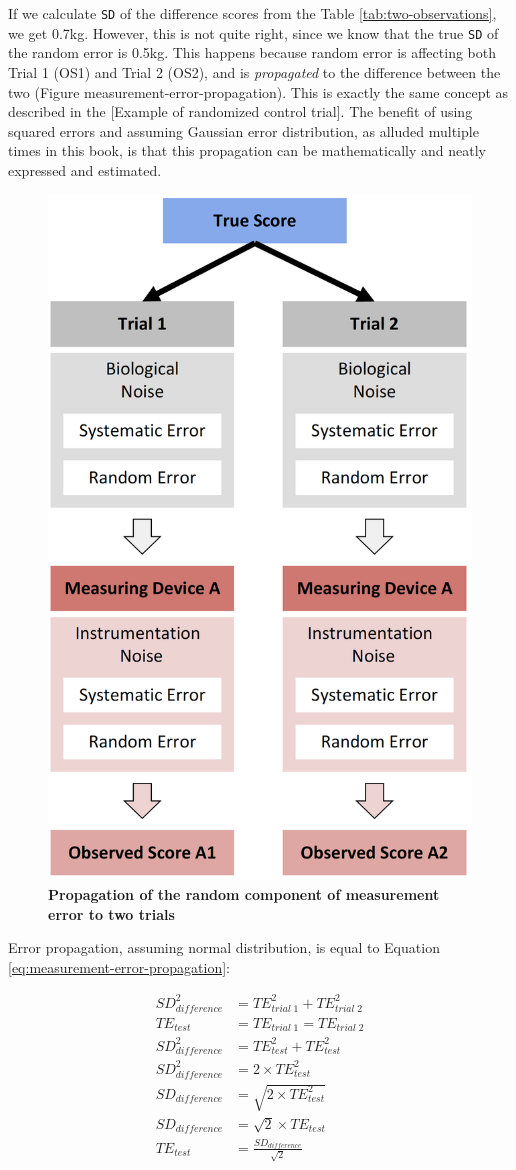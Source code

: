 \documentclass[
]{book}
\begin{document}
If we calculate \texttt{SD} of the difference scores from the Table \ref{tab:two-observations}, we get 0.7kg. However, this is not quite right, since we know that the true \texttt{SD} of the random error is 0.5kg. This happens because random error is affecting both Trial 1 (OS1) and Trial 2 (OS2), and is \emph{propagated} to the difference between the two (Figure measurement-error-propagation). This is exactly the same concept as described in the {[}Example of randomized control trial{]}. The benefit of using squared errors and assuming Gaussian error distribution, as alluded multiple times in this book, is that this propagation can be mathematically and neatly expressed and estimated.

\begin{figure}

{\centering \includegraphics[width=0.5\linewidth]{figures/measurement-error-two-measures} 

}

\caption{\textbf{Propagation of the random component of measurement error to two trials}}\label{fig:measurement-error-propagation}
\end{figure}



Error propagation, assuming normal distribution, is equal to Equation \eqref{eq:measurement-error-propagation}:

\begin{equation}
  \begin{split}
    SD_{difference}^2 &= TE_{trial\;1}^2 + TE_{trial\;2}^2 \\
    TE_{test} &= TE_{trial\;1} = TE_{trial\;2} \\
    SD_{difference}^2 &= TE_{test}^2 + TE_{test}^2 \\
    SD_{difference}^2 &= 2 \times TE_{test}^2 \\
    SD_{difference} &= \sqrt{2 \times TE_{test}^2} \\
    SD_{difference} &= \sqrt{2} \times TE_{test} \\
    TE_{test} &= \frac{SD_{difference}}{\sqrt{2}}
  \end{split}
  \label{eq:measurement-error-propagation}
\end{equation}
\end{document}
